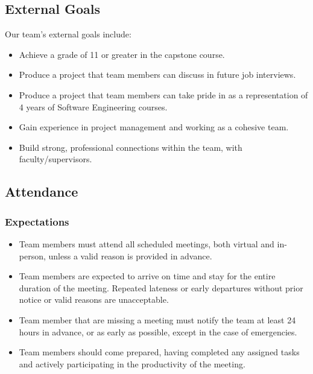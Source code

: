 \documentclass{article}
\begin{document}
\subsection*{External Goals}
Our team's external goals include:
\begin{itemize}
  \item Achieve a grade of 11 or greater in the capstone course.
  \item Produce a project that team members can discuss in future job interviews.
  \item Produce a project that team members can take pride in as a representation of 4 years of Software Engineering courses.
  \item Gain experience in project management and working as a cohesive team.
  \item Build strong, professional connections within the team, with faculty/supervisors.
\end{itemize}

\subsection*{Attendance}
\subsubsection*{Expectations}
\begin{itemize}
  \item Team members must attend all scheduled meetings, both virtual and in-person, unless a valid reason is provided in advance.
  \item Team members are expected to arrive on time and stay for the entire duration of the meeting. Repeated lateness or early departures without prior notice or valid reasons are unacceptable.
  \item Team member that are missing a meeting must notify the team at least 24 hours in advance, or as early as possible, except in the case of emergencies.
  \item Team members should come prepared, having completed any assigned tasks and actively participating in the productivity of the meeting.
\end{itemize}
\end{document}
